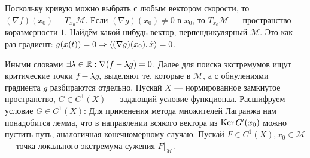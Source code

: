 \documentclass[a4paper]{article}
\begin{document}
    Поскольку кривую можно выбрать с любым вектором скорости, то $(\nabla f)(x_0) \perp T_{x_0}\mathcal{M}$.
    Если $(\nabla g)(x_0) \ne 0$ в $x_0$, то $T_{x_0}\mathcal{M}$ --- пространство коразмерности $1$.
    Найдём какой-нибудь вектор, перпендикулярный $\mathcal{M}$.
    Это как раз градиент: $g(x(t)) = 0 \Rightarrow \left\langle(\nabla g)(x_0), \dot{x}\right\rangle = 0$.

    Иными словами $\exists \lambda\in\mathbb{R}: \nabla(f - \lambda g) = 0$.
    Далее для поиска экстремумов ищут критические точки $f - \lambda g$, выделяют те, которые в $\mathcal{M}$, а с обнулениями градиента $g$ разбираются отдельно.
\ok
    Пускай $X$ --- нормированное замкнутое пространство, $G \in C^1(X)$ --- задающий условие функционал.
    Расшифруем условие $G \in C^1(X)$:
    Для применения метода множителей Лагранжа нам понадобится лемма, что в направлении всякого вектора из $\operatorname{Ker} G'(x_0)$ можно пустить путь, аналогичная конечномерному случаю.
    Пускай $F \in C^1(X), x_0 \in \mathcal{M}$ --- точка локального экстремума сужения $F\big|_{\mathcal{M}}$.
\end{document}
